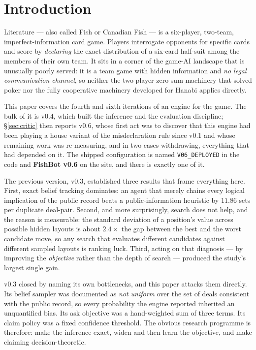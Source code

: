\documentclass[11pt,a4paper]{article}
\begin{document}
\section{Introduction}
\label{sec:intro}

Literature --- also called Fish or Canadian Fish --- is a six-player,
two-team, imperfect-information card game. Players interrogate opponents for
specific cards and score by \emph{declaring} the exact distribution of a
six-card half-suit among the members of their own team. It sits in a corner of
the game-AI landscape that is unusually poorly served: it is a team game with
hidden information and \emph{no legal communication channel}, so neither the
two-player zero-sum machinery that solved poker nor the fully cooperative
machinery developed for Hanabi applies directly.

This paper covers the fourth and sixth iterations of an engine for the game.
The bulk of it is v0.4, which built the inference and the evaluation
discipline; \S\ref{sec:critic} then reports v0.6, whose first act was to
discover that this engine had been playing a house variant of the
misdeclaration rule since v0.1 and whose remaining work was re-measuring, and
in two cases withdrawing, everything that had depended on it. The shipped
configuration is named \texttt{V06\_DEPLOYED} in the code and
\textbf{FishBot v0.6} on the site, and there is exactly one of it.

The previous version, v0.3, established three results that frame everything
here. First,
exact belief tracking dominates: an agent that merely chains every logical
implication of the public record beats a public-information heuristic by
$11.86$ sets per duplicate deal-pair. Second, and more surprisingly, search
does not help, and the reason is measurable: the standard deviation of a
position's value across possible hidden layouts is about $2.4\times$ the gap
between the best and the worst candidate move, so any search that evaluates
different candidates against different sampled layouts is ranking luck. Third,
acting on that diagnosis --- by improving the \emph{objective} rather than the
depth of search --- produced the study's largest single gain.

v0.3 closed by naming its own bottlenecks, and this paper attacks them
directly. Its belief sampler was documented as \emph{not uniform} over the set
of deals consistent with the public record, so every probability the engine
reported inherited an unquantified bias. Its ask objective was a hand-weighted
sum of three terms. Its claim policy was a fixed confidence threshold. The
obvious research programme is therefore: make the inference exact, widen and
then learn the objective, and make claiming decision-theoretic.
\end{document}
